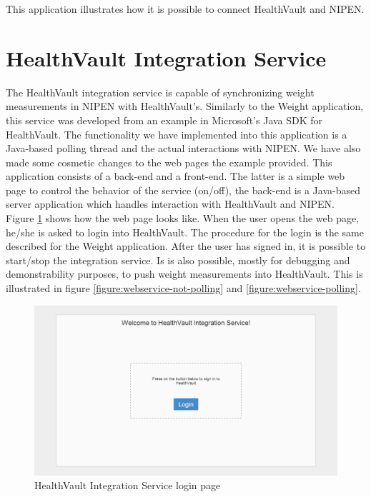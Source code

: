This application illustrates how it is possible to connect HealthVault and NIPEN.

\section{HealthVault Integration Service}

The HealthVault integration service is capable of synchronizing weight measurements in NIPEN with HealthVault's.
Similarly to the Weight application, this service was developed from an example in Microsoft's Java SDK for HealthVault.
The functionality we have implemented into this application is a Java-based polling thread and the actual
interactions with NIPEN. We have also made some cosmetic changes to the web pages the example provided.
This application consists of a back-end and a front-end. The latter is a simple web page to control
the behavior of the service (on/off), the back-end is a Java-based server application which handles
interaction with HealthVault and NIPEN.
Figure \ref{figure:webservice-login} shows how the web page looks like.
When the user opens the web page, he/she is asked to login into HealthVault.
The procedure for the login is the same described for the Weight application.
After the user has signed in, it is possible to start/stop the integration service.
Is is also possible, mostly for debugging and demonstrability purposes, to push weight measurements into HealthVault. 
This is illustrated in figure \ref{figure:webservice-not-polling} and \ref{figure:webservice-polling}.

\begin{figure}[H]
\centering
\includegraphics[scale=0.4]{../Figures/webservice-login.png}
\caption{HealthVault Integration Service login page}
\label{figure:webservice-login}
\end{figure}


